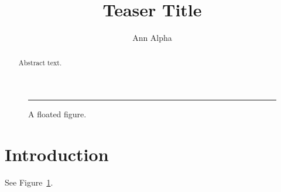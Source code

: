 \documentclass{article}
\begin{document}
\title{Teaser Title}
\author{Ann Alpha}
\maketitle
\begin{figure}[t]
  \centering
  \rule{4cm}{1cm}
  \caption{A floated figure.}\label{fig:float}
\end{figure}
\begin{abstract}
Abstract text.
\end{abstract}
\section{Introduction}
See Figure~\ref{fig:float}.
\clearpage
\end{document}
